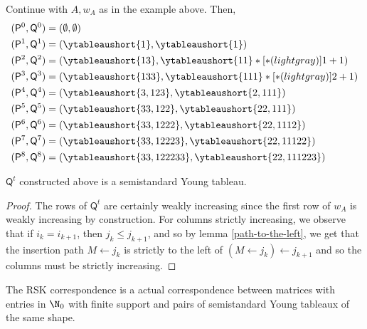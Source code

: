 \documentclass[11pt,leqno,oneside]{amsart}
\numberwithin{thm}{section}
\newcommand{\TP}{\mathsf{P}}
\newcommand{\TQ}{\mathsf{Q}}
\begin{document}
\begin{example}
  Continue with \(A,w_A\) as in the example above. Then,
  \begin{align*}
    (\TP^0, \TQ^0)
    & = \left( \emptyset, \emptyset \right) \\
    (\TP^1, \TQ^1)
    & = \left( \ytableaushort{1}, \ytableaushort{1} \right) \\
    (\TP^2, \TQ^2)
    & = \left( \ytableaushort{13},
      \ytableaushort{11}*[*(lightgray)]{1+1} \right) \\
    (\TP^3, \TQ^3)
    & = \left( \ytableaushort{133},
      \ytableaushort{111}*[*(lightgray)]{2+1} \right)\\
    (\TP^4, \TQ^4)
    & = \left( \ytableaushort{3,123}, \ytableaushort{2,111} \right)\\
    (\TP^5, \TQ^5)
    & = \left( \ytableaushort{33,122}, \ytableaushort{22,111} \right)\\
    (\TP^6, \TQ^6)
    & = \left( \ytableaushort{33,1222}, \ytableaushort{22,1112}
      \right) \\
    (\TP^7, \TQ^7)
    & = \left( \ytableaushort{33,12223}, \ytableaushort{22,11122}
      \right)\\
    (\TP^8, \TQ^8)
    & = \left( \ytableaushort{33,122233}, \ytableaushort{22,111223} \right)
  \end{align*}
\end{example}
\begin{lem}
  \(\TQ^t\) constructed above is a semistandard Young tableau.
\end{lem}
\begin{proof}
  The rows of \(\TQ^t\) are certainly weakly increasing since the
  first row of \(w_A\) is weakly increasing by construction. For
  columns strictly increasing, we observe that if \(i_k = i_{k+1}\),
  then \(j_k \leq j_{k+1}\), and so by lemma \ref{path-to-the-left},
  we get that the insertion path \(M \leftarrow j_k\) is strictly to
  the left of \((M \leftarrow j_k) \leftarrow j_{k+1}\) and so the
  columns must be strictly increasing.
\end{proof}
\begin{thm}
  The RSK correspondence is a actual correspondence between matrices
  with entries in \(\N_0\) with finite support and pairs of
  semistandard Young tableaux of the same shape.
\end{thm}
\end{document}
